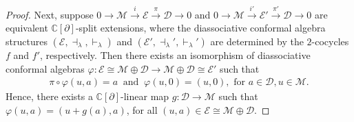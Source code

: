 \documentclass[10pt,a4paper]{amsart}
\newcommand{\C}{\mathbb{C}}
\newcommand{\D}{\mathcal{D}}
\newcommand{\E}{\mathcal{E}}
\newcommand{\M}{\mathcal{M}}
\renewcommand{\ker}{\operatorname{Ker}}
\newcommand{\la}{\lambda}
\newcommand{\p}{\partial}
\begin{document}
\begin{proof}
Next, suppose $0\longrightarrow
\M
\xrightarrow{\ i \ }
\E
\xrightarrow{\ \pi\ }
\D
\longrightarrow 0$ and $0\longrightarrow
\M
\xrightarrow{\ i' \ }
\E'
\xrightarrow{\ \pi' \ }
\D
\longrightarrow 0$
are equivalent $\C[\partial]$-split extensions, where the diassociative conformal algebra structures $(\E, \dashv_{\la}, \vdash_{\la})$ and $(\E', \dashv_{\la}',\vdash_{\la}')$ are determined by the $2$-cocycles $f$ and $f'$, respectively. Then there exists an isomorphism of diassociative conformal algebras $\varphi : \E \cong \M \oplus \D \longrightarrow \M \oplus \D \cong \E'$ such that 
\begin{align}
\pi\circ \varphi (u, a)= a ~ \text{ and } ~
\varphi (u,0)=(u,0),  \text{ for } a \in \D,  u \in \M.  \label{eq4}
\end{align}
Hence, there exists a $\C [\partial]$-linear map $g : \D \longrightarrow \M$ such that $\varphi (u, a) = (u + g (a), a)$, for all $(u, a) \in \E \cong \M \oplus \D$.

\end{proof}
\end{document}
